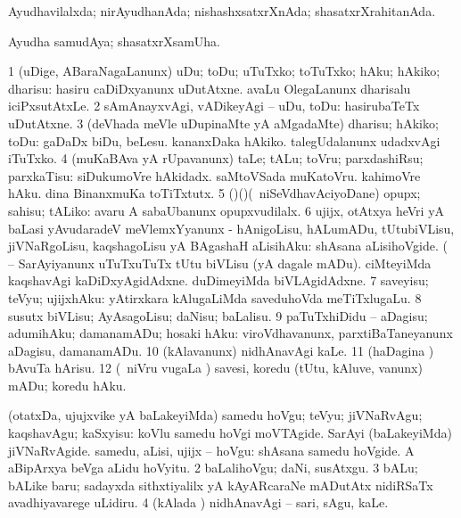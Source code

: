 \bentry
{} 
\gl{\gu}
\expl{}
\bmng
Ayudhavilalxda; nirAyudhanAda; nishashxsatxrXnAda; shasatxrXrahitanAda. 
\emng
\eentry

\bentry
{} 
\gl{\nA}
\expl{}
\bmng
Ayudha samudAya; shasatxrXsamUha. 
\emng
\eentry

\bentry
{} 
\gl{\kirx}
\bmng
\emng

\noindent 
\gl{\sakirx}
\expl{}
\bmng
\bnum
\num{1} (uDige, ABaraNagaLanunx) uDu; toDu; uTuTxko; toTuTxko; hAku; hAkiko; dharisu:  hasiru caDiDxyanunx uDutAtxne.  avaLu OlegaLanunx dharisalu iciPxsutAtxLe. 
\num{2} sAmAnayxvAgi, vADikeyAgi -- uDu, toDu:  hasirubaTeTx uDutAtxne. 
\num{3} (deVhada meVle uDupinaMte yA aMgadaMte) dharisu; hAkiko; toDu:  gaDaDx biDu, beLesu.  kananxDaka hAkiko.  talegUdalanunx udadxvAgi iTuTxko. 
\num{4} (muKaBAva yA rUpavanunx) taLe; tALu; toVru; parxdashiRsu; parxkaTisu:  siDukumoVre hAkidadx.  saMtoVSada muKatoVru.  kahimoVre hAku.  dina BinanxmuKa toTiTxtutx. 
\num{5} (\birx)(\AmA)(\sA\ niSeVdhavAciyoDane) opupx; sahisu; tALiko:  avaru A sabaUbanunx opupxvudilalx. 
\num{6} ujijx, otAtxya heVri yA baLasi yAvudaradeV meVlemxYyanunx - hAnigoLisu, hALumADu, tUtubiVLisu, jiVNaRgoLisu, kaqshagoLisu yA BAgashaH aLisihAku:  shAsana aLisihoVgide.  (  -- SarAyiyanunx uTuTxuTuTx tUtu biVLisu (yA dagale mADu).  ciMteyiMda kaqshavAgi kaDiDxyAgidAdxne.  duDimeyiMda biVLAgidAdxne. 
\num{7} saveyisu; teVyu; ujijxhAku:  yAtirxkara kAlugaLiMda saveduhoVda meTiTxlugaLu. 
\num{8} susutx biVLisu; AyAsagoLisu; daNisu; baLalisu. 
\num{9} paTuTxhiDidu -- aDagisu; adumihAku; damanamADu; hosaki hAku:  viroVdhavanunx, parxtiBaTaneyanunx aDagisu, damanamADu. 
\num{10} (kAlavanunx) nidhAnavAgi kaLe. 
\num{11} (haDagina \vi) bAvuTa hArisu. 
\num{12} (\sA\ niVru \mo vugaLa \vi) savesi, koredu (tUtu, kAluve, \mo vanunx) mADu; koredu hAku. 
\enum
\emng

\noindent 
\gl{\akirx}
\expl{}
\bmng
\bnum
{} (otatxDa, ujujxvike yA baLakeyiMda) 
\banum
{} samedu hoVgu; teVyu; jiVNaRvAgu; kaqshavAgu; kaSxyisu:  koVlu samedu hoVgi moVTAgide.  SarAyi (baLakeyiMda) jiVNaRvAgide. 
 samedu, aLisi, ujijx -- hoVgu:  shAsana samedu hoVgide.  A aBipArxya beVga aLidu hoVyitu. 
\eanum
\numie
\num{2} baLalihoVgu; daNi, susAtxgu. 
\num{3} bALu; bALike baru; sadayxda sithxtiyalilx yA kAyARcaraNe mADutAtx nidiRSaTx avadhiyavarege uLidiru. 
\num{4} (kAlada \vi) nidhAnavAgi -- sari, sAgu, kaLe. 
\enum
\emng

